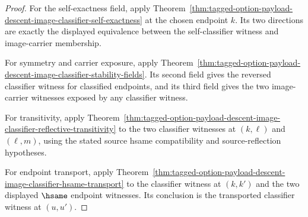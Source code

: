 \begin{proof}
For the self-exactness field, apply
Theorem~\ref{thm:tagged-option-payload-descent-image-classifier-self-exactness}
at the chosen endpoint $k$. Its two directions are exactly the displayed
equivalence between the self-classifier witness and image-carrier membership.

For symmetry and carrier exposure, apply
Theorem~\ref{thm:tagged-option-payload-descent-image-classifier-stability-fields}.
Its second field gives the reversed classifier witness for classified endpoints,
and its third field gives the two image-carrier witnesses exposed by any
classifier witness.

For transitivity, apply
Theorem~\ref{thm:tagged-option-payload-descent-image-classifier-reflective-transitivity}
to the two classifier witnesses at $(k,\ell)$ and $(\ell,m)$, using the stated
source hsame compatibility and source-reflection hypotheses.

For endpoint transport, apply
Theorem~\ref{thm:tagged-option-payload-descent-image-classifier-hsame-transport}
to the classifier witness at $(k,k')$ and the two displayed $\hsame$ endpoint
witnesses. Its conclusion is the transported classifier witness at $(u,u')$.
\end{proof}

